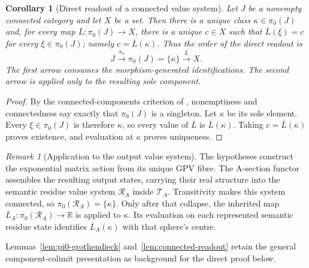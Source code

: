 \documentclass[11pt]{article}
\newcommand{\RR}{\mathbb{R}}
\theoremstyle{plain}
\newtheorem{corollary}[theorem]{Corollary}
\theoremstyle{definition}
\theoremstyle{remark}
\newtheorem{remark}[theorem]{Remark}
\begin{document}
\begin{corollary}[Direct readout of a connected value system]\label{cor:direct-connected-readout}
Let $J$ be a nonempty connected category and let $X$ be a set. Then there is
a unique class $\kappa\in\pi_0(J)$ and, for every map
$\overline L:\pi_0(J)\to X$, there is a unique $c\in X$ such that
$\overline L(\xi)=c$ for every $\xi\in\pi_0(J)$; namely
$c=\overline L(\kappa)$. Thus the order of the direct readout is
\[
  J\xrightarrow{\ \pi_0\ }\pi_0(J)=\{\kappa\}
    \xrightarrow{\ \overline L\ }X.
\]
The first arrow consumes the morphism-generated identifications. The second
arrow is applied only to the resulting sole component.
\end{corollary}
\begin{proof}
By the connected-components criterion of \cite[\S8.3,
Rem.~8.3.5]{Riehl}, nonemptiness and connectedness say exactly that
$\pi_0(J)$ is a singleton. Let $\kappa$ be its sole element. Every
$\xi\in\pi_0(J)$ is therefore $\kappa$, so every value of $\overline L$ is
$\overline L(\kappa)$. Taking $c=\overline L(\kappa)$ proves existence, and
evaluation at $\kappa$ proves uniqueness.
\end{proof}

\begin{remark}[Application to the output value system]\label{rmk:direct-output-readout}
The hypotheses construct the exponential matrix action from its unique
GPV fibre. The A-section functor assembles the resulting output states,
carrying their real structure into the semantic residue value system
$\mathcal R_A$ inside $\mathcal T_A$. Transitivity makes this system
connected, so $\pi_0(\mathcal R_A)=\{\kappa\}$. Only after that collapse, the
inherited map $\overline L_A:\pi_0(\mathcal R_A)\to\RR$ is applied to
$\kappa$. Its evaluation
on each represented semantic residue state identifies
$\overline L_A(\kappa)$ with that sphere's centre.

Lemmas~\ref{lem:pi0-grothendieck} and~\ref{lem:connected-readout} retain the
general component-colimit presentation as background for the direct proof below.

\end{remark}
\end{document}
